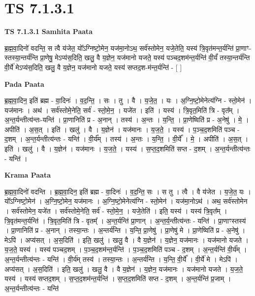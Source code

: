 \documentclass[17pt]{extarticle}
\begin{document}
\section{ TS 7.1.3.1 }

\textbf{TS 7.1.3.1 } \newline
\textbf{Samhita Paata} \newline

ब्र॒ह्म॒वा॒दिनो॑ वदन्ति॒ स त्वै य॑जेत॒ यो᳚ऽग्निष्टो॒मेन॒ यज॑मा॒नोऽथ॒ सर्व॑स्तोमेन॒ यजे॒तेति॒ यस्य॑ त्रि॒वृत॑मन्त॒र्यन्ति॑ प्रा॒णाꣳ-स्तस्या॒न्तर्य॑न्ति प्रा॒णेषु॒ मेऽप्य॑स॒दिति॒ खलु॒ वै य॒ज्ञेन॒ यज॑मानो यजते॒ यस्य॑ पञ्चद॒शम॑न्त॒र्यन्ति॑ वी॒र्यं॑ तस्या॒न्तर्य॑न्ति वी॒र्ये॑ मेऽप्य॑स॒दिति॒ खलु॒ वै य॒ज्ञेन॒ यज॑मानो यजते॒ यस्य॑ सप्तद॒श-म॑न्त॒र्यन्ति॑ - [  ] \newline

\textbf{Pada Paata} \newline

ब्र॒ह्म॒वा॒दिन॒ इति॑ ब्रह्म - वा॒दिनः॑ । व॒द॒न्ति॒ । सः । तु । वै । य॒जे॒त॒ । यः । अ॒ग्नि॒ष्टो॒मेनेत्य॑ग्नि - स्तो॒मेन॑ । यज॑मानः । अथ॑ । सर्व॑स्तोमे॒नेति॒ सर्व॑ - स्तो॒मे॒न॒ । यजे॑त । इति॑ । यस्य॑ । त्रि॒वृत॒मिति॑ त्रि - वृत᳚म् । अ॒न्त॒र्यन्तीत्य॑न्तः-यन्ति॑ । प्रा॒णानिति॑ प्र - अ॒नान् । तस्य॑ । अ॒न्तः । य॒न्ति॒ । प्रा॒णेष्विति॑ प्र - अ॒नेषु॑ । मे॒ । अपीति॑ । अ॒स॒त् । इति॑ । खलु॑ । वै । य॒ज्ञेन॑ । यज॑मानः । य॒ज॒ते॒ । यस्य॑ । प॒ञ्च॒द॒शमिति॑ पञ्च - द॒शम् । अ॒न्त॒र्यन्तीत्य॑न्तः - यन्ति॑ । वी॒र्य᳚म् । तस्य॑ । अ॒न्तः । य॒न्ति॒ । वी॒र्ये᳚ । मे॒ । अपीति॑ । अ॒स॒त् । इति॑ । खलु॑ । वै । य॒ज्ञेन॑ । यज॑मानः । य॒ज॒ते॒ । यस्य॑ । स॒प्त॒द॒शमिति॑ सप्त - द॒शम् । अ॒न्त॒र्यन्तीत्य॑न्तः - यन्ति॑ ।  \newline


\textbf{Krama Paata} \newline

ब्र॒ह्म॒वा॒दिनो॑ वदन्ति । ब्र॒ह्म॒वा॒दिन॒ इति॑ ब्रह्म - वा॒दिनः॑ । व॒द॒न्ति॒ सः । स तु । त्वै । वै य॑जेत । य॒जे॒त॒ यः । यो᳚ऽग्निष्टो॒मेन॑ । अ॒ग्नि॒ष्टो॒मेन॒ यज॑मानः । अ॒ग्नि॒ष्टो॒मेनेत्य॑ग्नि - स्तो॒मेन॑ । यज॑मा॒नोऽथ॑ । अथ॒ सर्व॑स्तोमेन । सर्व॑स्तोमेन॒ यजे॑त । सर्व॑स्तोमे॒नेति॒ सर्व॑ - स्तो॒मे॒न॒ । यजे॒तेति॑ । इति॒ यस्य॑ । यस्य॑ त्रि॒वृत᳚म् । त्रि॒वृत॑मन्त॒र्यन्ति॑ । त्रि॒वृत॒मिति॑ त्रि - वृतम्᳚ । अ॒न्त॒र्यन्ति॑ प्रा॒णान् । अ॒न्त॒र्य॒न्तीत्य॑न्तः - यन्ति॑ । प्रा॒णाꣳस्तस्य॑ । प्रा॒णानिति॑ प्र - अ॒नान् । तस्या॒न्तः । अ॒न्तर्य॑न्ति । य॒न्ति॒ प्रा॒णेषु॑ । प्रा॒णेषु॑ मे । प्रा॒णेष्विति॑ प्र - अ॒नेषु॑ । मेऽपि॑ । अप्य॑सत् । अ॒स॒दिति॑ । इति॒ खलु॑ । खलु॒ वै । वै य॒ज्ञेन॑ । य॒ज्ञेन॒ यज॑मानः । यज॑मानो यजते । य॒ज॒ते॒ यस्य॑ । यस्य॑ पञ्चद॒शम् । प॒ञ्च॒द॒शम॑न्त॒र्यन्ति॑ । प॒ञ्च॒द॒शमिति॑ पञ्च - द॒शम् । अ॒न्त॒र्यन्ति॑ वी॒र्य᳚म् । अ॒न्त॒र्यन्तीत्य॑न्तः - यन्ति॑ । वी॒र्य॑म् तस्य॑ । तस्या॒न्तः । अ॒न्तर्य॑न्ति । य॒न्ति॒ वी॒र्ये᳚ । वी॒र्ये॑ मे । मेऽपि॑ । अप्य॑सत् । अ॒स॒दिति॑ । इति॒ खलु॑ । खलु॒ वै । वै य॒ज्ञेन॑ । य॒ज्ञेन॒ यज॑मानः । यज॑मानो यजते । य॒ज॒ते॒ यस्य॑ । यस्य॑ सप्तद॒शम् । स॒प्त॒द॒शम॑न्त॒र्यन्ति॑ । स॒प्त॒द॒शमिति॑ सप्त - द॒शम् । अ॒न्त॒र्यन्ति॑ प्र॒जाम् । अ॒न्त॒र्यन्तीत्य॑न्तः - यन्ति॑ \newline
\end{document}
